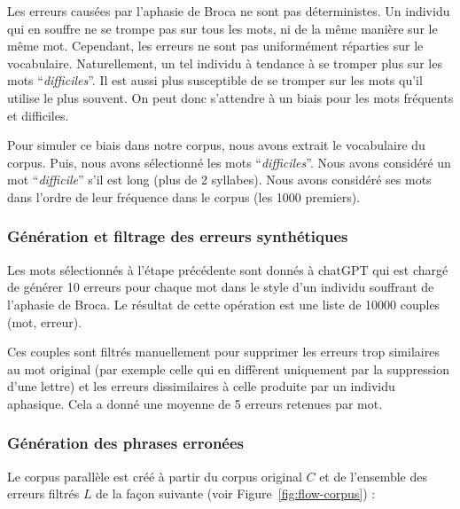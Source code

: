 Les erreurs causées par l'aphasie de Broca ne sont pas déterministes.
Un individu qui en souffre ne se trompe pas sur tous les mots, ni de la même manière sur le même mot.
Cependant, les erreurs ne sont pas uniformément réparties sur le vocabulaire.
Naturellement, un tel individu à tendance à se tromper plus sur les mots ``\emph{difficiles}''.
Il est aussi plus susceptible de se tromper sur les mots qu'il utilise le plus souvent.
On peut donc s'attendre à un biais pour les mots fréquents et difficiles.

Pour simuler ce biais dans notre corpus, nous avons extrait le vocabulaire du corpus.
Puis, nous avons sélectionné les mots ``\emph{difficiles}''. 
Nous avons considéré un mot ``\emph{difficile}'' s'il est long (plus de 2 syllabes).
Nous avons considéré ses mots dans l'ordre de leur fréquence dans le corpus (les 1000 premiers).

\subsubsection{Génération et filtrage des erreurs synthétiques}

Les mots sélectionnés à l'étape précédente sont donnés à chatGPT 
qui est chargé de générer 10 erreurs pour chaque mot dans le style d'un individu souffrant de l'aphasie de Broca.
Le résultat de cette opération est une liste de 10000 couples (mot, erreur).

Ces couples sont filtrés manuellement pour supprimer les erreurs trop similaires au mot original 
(par exemple celle qui en diffèrent uniquement par la suppression d'une lettre)
et les erreurs dissimilaires à celle produite par un individu aphasique.
Cela a donné une moyenne de 5 erreurs retenues par mot.

\subsubsection{Génération des phrases erronées}

Le corpus parallèle est créé à partir du corpus original \(C\) et de l'ensemble des erreurs filtrés \(L\) 
de la façon suivante (voir Figure~\ref{fig:flow-corpus}) :

